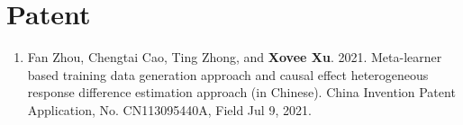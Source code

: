 \section*{Patent}

\begin{enumerate}
    \item Fan Zhou, Chengtai Cao, Ting Zhong, and \textbf{Xovee Xu}. 2021. Meta-learner based training data generation approach and causal effect heterogeneous response difference estimation approach (in Chinese). China Invention Patent Application, No. CN113095440A, Field Jul 9, 2021. 
\end{enumerate}
